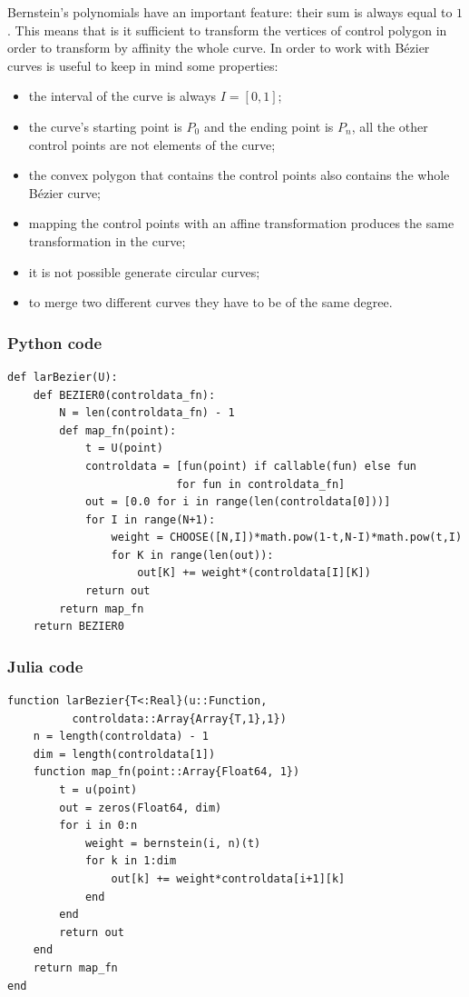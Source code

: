 \documentclass[a4paper,11pt]{article}
\begin{document}
Bernstein's polynomials have an important feature: their sum is always equal to $1$. This means that is it sufficient to transform the vertices of control polygon in order to transform by affinity the whole curve.
In order to work with B\'ezier curves is useful to keep in mind some properties:
\begin{itemize}
\item the interval of the curve is always $I=[0,1]$;
\item the curve's starting point is $P_0$ and the ending point is $P_n$, all the other control points are not elements of the curve;
\item the convex polygon that contains the control points also contains the whole B\'ezier curve;
\item mapping the control points with an affine transformation produces the same transformation in the curve;
\item it is not possible generate circular curves;
\item to merge two different curves they have to be of the same degree.
\end{itemize}

\subsubsection{Python code}

\begin{verbatim}
def larBezier(U):
    def BEZIER0(controldata_fn):
        N = len(controldata_fn) - 1
        def map_fn(point):
            t = U(point)
            controldata = [fun(point) if callable(fun) else fun
                          for fun in controldata_fn]
            out = [0.0 for i in range(len(controldata[0]))]
            for I in range(N+1):
                weight = CHOOSE([N,I])*math.pow(1-t,N-I)*math.pow(t,I)
                for K in range(len(out)): 
                    out[K] += weight*(controldata[I][K])
            return out
        return map_fn
    return BEZIER0
\end{verbatim}

\subsubsection{Julia code}

\begin{verbatim}
function larBezier{T<:Real}(u::Function, 
          controldata::Array{Array{T,1},1})
    n = length(controldata) - 1
    dim = length(controldata[1])
    function map_fn(point::Array{Float64, 1})
        t = u(point)
        out = zeros(Float64, dim)
        for i in 0:n
            weight = bernstein(i, n)(t)
            for k in 1:dim
                out[k] += weight*controldata[i+1][k]
            end
        end
        return out
    end
    return map_fn
end
\end{verbatim}
\end{document}
